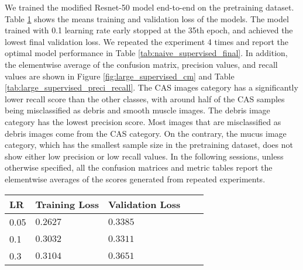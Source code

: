 \documentclass[12pt,twoside]{report}
\begin{document}
We trained the modified Resnet-50 model end-to-end on the pretraining dataset. Table \ref{tab:large_supervised_tuning} shows the means training and validation loss of the models. The model trained with 0.1 learning rate early stopped at the 35th epoch, and achieved the lowest final validation loss. We repeated the experiment 4 times and report the optimal model performance in Table \ref{tab:naive_supervised_final}. In addition, the elementwise average of the confusion matrix, precision values, and recall values are shown in Figure \ref{fig:large_supervised_cm} and Table \ref{tab:large_supervised_preci_recall}. The CAS images category has a significantly lower recall score than the other classes, with around half of the CAS samples being misclassified as debris and smooth muscle images. The debris image category has the lowest precision score. Most images that are misclassified as debris images come from the CAS category. On the contrary, the mucus image category, which has the smallest sample size in the pretraining dataset, does not show either low precision or low recall values. In the following sessions, unless otherwise specified, all the confusion matrices and metric tables report the elementwise averages of the scores generated from repeated experiments.\\




\begin{table}[]
    \centering
    \begin{tabular}{lllll}
    \toprule
    LR & Training Loss & Validation Loss \\
    \midrule
    0.05 & $0.2627$ & $0.3385$\\
    0.1 & $0.3032$ & $0.3311$\\
    0.3 & $0.3104$ & $0.3651$\\
    \bottomrule
    \end{tabular}
    \captionsetup{type=table}
    \label{tab:large_supervised_tuning}
\end{table}
\end{document}
